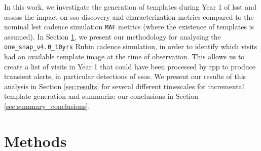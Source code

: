 \documentclass[preprintm,linenumbers]{aastex631}
\newcommand{\baselinefull}{\texttt{one\_snap\_v4.0\_10yrs}\xspace}
\newcommand{\maf}{\texttt{MAF}\xspace}
\begin{document}
 In this work, we investigate the generation of templates during Year 1 of \gls*{lsst} and assess the impact on \gls*{sso} discovery \sout{and characterization} metrics compared to the nominal \gls*{lsst} cadence simulation \maf metrics  (where the existence of templates is assumed). 
 In Section \ref{sec:methods}, we present our methodology for analysing the \baselinefull Rubin cadence simulation, %
 in order to identify which visits had an available template image at the time of observation.
 This allows us to create a list of visits in Year 1 that could have been processed by \gls*{rpp} to produce transient alerts, in particular detections of \glspl*{sso}.
 We present our results of this analysis in Section \ref{sec:results} for several different timescales for incremental template generation and summarize our conclusions in Section \ref{sec:summary_conclusions}.  
	
	\section{Methods}
	\label{sec:methods}
\end{document}
